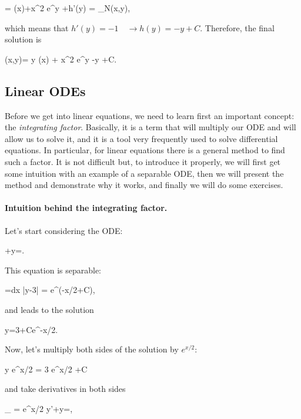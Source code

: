 \bnn
	 = \sin(x)+x^2 e^y +h'(y) = _{N(x,y)},
\enn

which means that $h'(y)=-1 \quad \rightarrow h(y)=-y+C$. Therefore, the final solution is

\bnn
   \Psi(x,y)= y \sin(x) + x^2 e^y -y +C.
\enn  

\subsection{Linear ODEs}
 
Before we get into linear equations, we need to learn first an important concept: the {\em integrating factor}. Basically, it is a term that will multiply our ODE and will allow us to solve it, and it is a tool very frequently
used to solve differential equations. In particular, for linear equations there is a general method to find such a factor. It is not difficult but, to introduce it properly, we
will first get some intuition with an example of a separable ODE, then we will present the method and
demonstrate why it works, and finally we will do some exercises.

\paragraph{Intuition behind the integrating factor. } Let's start considering the ODE:

\bnn
	+y=.
\enn

This equation is separable:

\bnn
	\int {}=\int {}dx \quad \rightarrow \ln |y-3| = e^{(-x/2+C)},
\enn

and leads to the solution 
 

\bnn y=3+Ce^{-x/2}. \enn

Now, let's multiply both sides of the solution by $e^{x/2}$:

\bnn y e^{x/2} = 3 e^{x/2} +C \enn

and take derivatives in both sides

\bnn {}_{\small{}} = e^{x/2} \quad \rightarrow 	y'+y=, \enn

